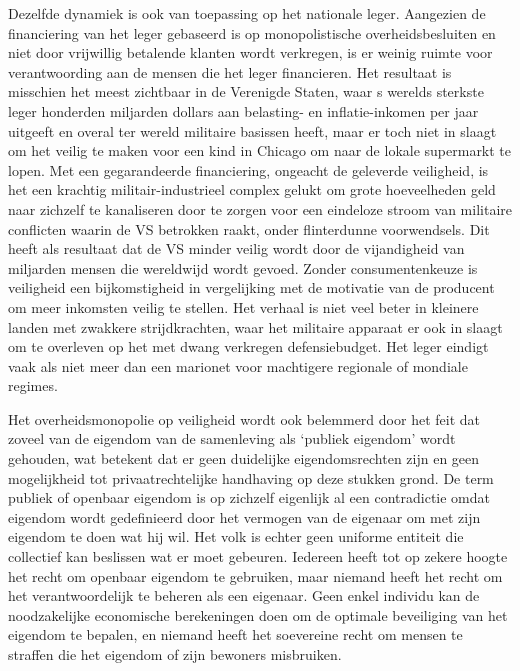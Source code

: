 Dezelfde dynamiek is ook van toepassing op het nationale leger. Aangezien de financiering van het leger gebaseerd is op monopolistische overheidsbesluiten en niet door vrijwillig betalende klanten wordt verkregen, is er weinig ruimte voor verantwoording aan de mensen die het leger financieren. Het resultaat is misschien het meest zichtbaar in de Verenigde Staten, waar \textquotesingle s werelds sterkste leger honderden miljarden dollars aan belasting- en inflatie-inkomen per jaar uitgeeft en overal ter wereld militaire basissen heeft, maar er toch niet in slaagt om het veilig te maken voor een kind in Chicago om naar de lokale supermarkt te lopen. Met een gegarandeerde financiering, ongeacht de geleverde veiligheid, is het een krachtig militair-industrieel complex gelukt om grote hoeveelheden geld naar zichzelf te kanaliseren door te zorgen voor een eindeloze stroom van militaire conflicten waarin de VS betrokken raakt, onder flinterdunne voorwendsels. Dit heeft als resultaat dat de VS minder veilig wordt door de vijandigheid van miljarden mensen die wereldwijd wordt gevoed. Zonder consumentenkeuze is veiligheid een bijkomstigheid in vergelijking met de motivatie van de producent om meer inkomsten veilig te stellen. Het verhaal is niet veel beter in kleinere landen met zwakkere strijdkrachten, waar het militaire apparaat er ook in slaagt om te overleven op het met dwang verkregen defensiebudget. Het leger eindigt vaak als niet meer dan een marionet voor machtigere regionale of mondiale regimes.

Het overheidsmonopolie op veiligheid wordt ook belemmerd door het feit dat zoveel van de eigendom van de samenleving als `publiek eigendom' wordt gehouden, wat betekent dat er geen duidelijke eigendomsrechten zijn en geen mogelijkheid tot privaatrechtelijke handhaving op deze stukken grond. De term publiek of openbaar eigendom is op zichzelf eigenlijk al een contradictie omdat eigendom wordt gedefinieerd door het vermogen van de eigenaar om met zijn eigendom te doen wat hij wil. Het volk is echter geen uniforme entiteit die collectief kan beslissen wat er moet gebeuren. Iedereen heeft tot op zekere hoogte het recht om openbaar eigendom te gebruiken, maar niemand heeft het recht om het verantwoordelijk te beheren als een eigenaar. Geen enkel individu kan de noodzakelijke economische berekeningen doen om de optimale beveiliging van het eigendom te bepalen, en niemand heeft het soevereine recht om mensen te straffen die het eigendom of zijn bewoners misbruiken.\autocite{208}

